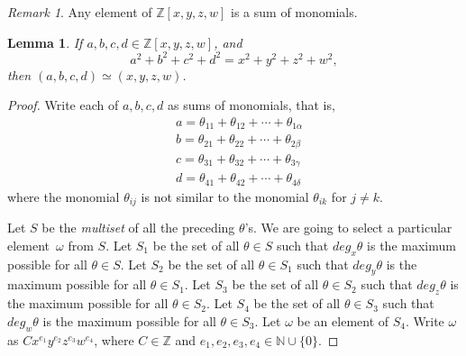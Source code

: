 \documentclass[12pt]{article}
\newtheorem{lemma}[theorem]{Lemma}
\theoremstyle{definition}
\theoremstyle{remark}
\newtheorem{remark}[theorem]{Remark}
\newcommand{\Nnn}{\mathbb N}
\newcommand{\Zzz}{\mathbb Z}
\numberwithin{equation}{section}
\begin{document}
\begin{remark}
Any element of \( \Zzz[x,y,z,w] \) is a sum of monomials.
\end{remark}

\begin{lemma}
If \(a, b, c, d \in \Zzz[x,y,z,w]\), and
\[
a^2 + b^2 + c^2 + d^2 = x^2 + y^2 + z^2 + w^2,
\]
then \( (a, b, c, d ) \simeq (x, y, z, w )\).
\end{lemma}
\begin{proof}
Write each of \( a,b,c,d \) as sums of monomials, that is, 
\begin{align*}
&a = \theta_{11} + \theta_{12} + \cdots + \theta_{1\alpha}
\\
&b = \theta_{21} + \theta_{22} + \cdots + \theta_{2\beta}
\\
&c = \theta_{31} + \theta_{32} + \cdots + \theta_{3\gamma}
\\
&d = \theta_{41} + \theta_{42} + \cdots + \theta_{4\delta}
\end{align*}
where the monomial \( \theta_{ij}\) is not similar
to the monomial \(\theta_{ik}\) for \( j \neq k\).

Let \(S\) be the \emph{multiset} of all the preceding \( \theta \)'s.
We are going to select a particular element~\( \omega \)
from \( S \).
Let \( S_1 \) be the set of all \( \theta \in S  \) such that
\( deg_x \theta \) is the maximum possible for all \( \theta \in S \).
Let \( S_2 \) be the set of all \( \theta \in S_1  \) such that
\( deg_y \theta \) is the maximum possible for all \( \theta \in S_1 \).
Let \( S_3 \) be the set of all \( \theta \in S_2  \) such that
\( deg_z \theta \) is the maximum possible for all \( \theta \in S_2 \).
Let \( S_4 \) be the set of all \( \theta \in S_3  \) such that
\( deg_w \theta \) is the maximum possible for all \( \theta \in S_3 \).
Let \( \omega \) be an element of \( S_4 \). 
Write \( \omega \) as \(Cx^{e_1}y^{e_2}z^{e_3}w^{e_4}\), where \( C \in \Zzz \)
and \( e_1,e_2,e_3,e_4 \in \Nnn \cup \{0\} \).


\end{proof}
\end{document}

